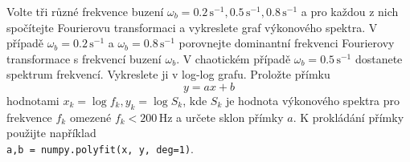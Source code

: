 \documentclass[a4paper,11pt,twoside]{article}
\def\code#1{\textnormal{\texttt{#1}}}
\begin{document}
\begin{enumerate}
        Volte tři různé frekvence buzení $\omega_{b}=0.2\,\mathrm{s}^{-1}, 0.5\,\mathrm{s}^{-1}, 0.8\,\mathrm{s}^{-1}$ a pro každou z nich spočítejte Fourierovu transformaci a vykreslete graf výkonového spektra.
        V případě $\omega_{b}=0.2\,\mathrm{s}^{-1}$ a $\omega_{b}=0.8\,\mathrm{s}^{-1}$ porovnejte dominantní frekvenci Fourierovy transformace s frekvencí buzení $\omega_{b}$.
        V chaotickém případě $\omega_{b}=0.5\,\mathrm{s}^{-1}$ dostanete  spektrum frekvencí.
        Vykreslete ji v log-log grafu. 
        Proložte přímku 
        \begin{equation*}
            y=ax+b
        \end{equation*}
        hodnotami $x_{k}=\log{f}_{k},y_{k}=\log{S}_{k}$, kde $S_{k}$ je hodnota výkonového spektra pro frekvence $f_{k}$ omezené $f_{k}<200\,\mathrm{Hz}$ a určete sklon přímky $a$.
        K prokládání přímky použijte například\\
        \code{a,b = numpy.polyfit(x, y, deg=1)}.

\end{enumerate}
\end{document}
